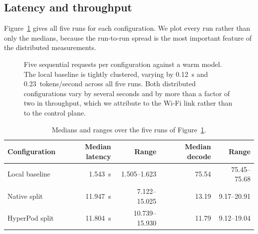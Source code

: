 \subsection{Latency and throughput}
\label{sec:perf}

Figure~\ref{fig:perf} gives all five runs for each configuration. We plot every
run rather than only the medians, because the run-to-run spread is the most
important feature of the distributed measurements.

\begin{figure}[htbp]
\centering
{}
\caption{Five sequential requests per configuration against a warm model.
The local baseline is tightly clustered, varying by \SI{0.12}{\second} and
\SI{0.23}{tokens/second} across all five runs. Both distributed configurations
vary by several seconds and by more than a factor of two in throughput, which
we attribute to the Wi-Fi link rather than to the control plane.}
\label{fig:perf}
\end{figure}

\begin{table}[htbp]
\centering\small
\caption{Medians and ranges over the five runs of Figure~\ref{fig:perf}.}
\label{tab:perf}
\begin{tabular}{@{}lrrrr@{}}
\toprule
\textbf{Configuration} & \textbf{Median latency} & \textbf{Range} & \textbf{Median decode} & \textbf{Range} \\
\midrule
Local baseline  & \SI{1.543}{\second}  & 1.505--1.623 & \SI{75.54}{} & 75.45--75.68 \\
Native split    & \SI{11.947}{\second} & 7.122--15.025 & \SI{13.19}{} & 9.17--20.91 \\
HyperPod split  & \SI{11.804}{\second} & 10.739--15.930 & \SI{11.79}{} & 9.12--19.04 \\
\bottomrule
\end{tabular}
\end{table}


